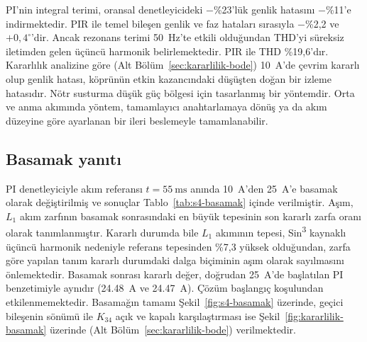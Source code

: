 PI'nin integral terimi, oransal denetleyicideki $-$\%23'lük genlik hatasını $-$\%11'e indirmektedir. PIR ile temel bileşen genlik ve faz hataları sırasıyla $-$\%2,2 ve $+0{,}4^{\circ}$'dir. Ancak rezonans terimi \SI{50}{\hertz}'te etkili olduğundan THD'yi süreksiz iletimden gelen üçüncü harmonik belirlemektedir. PIR ile THD \%19,6'dır. Kararlılık analizine göre (Alt Bölüm~\ref{sec:kararlilik-bode}) \SI{10}{\ampere}'de çevrim kararlı olup genlik hatası, köprünün etkin kazancındaki düşüşten doğan bir izleme hatasıdır. Nötr susturma düşük güç bölgesi için tasarlanmış bir yöntemdir. Orta ve anma akımında yöntem, tamamlayıcı anahtarlamaya dönüş ya da akım düzeyine göre ayarlanan bir ileri beslemeyle tamamlanabilir.

\subsection{Basamak yanıtı}

PI denetleyiciyle akım referansı $t=\SI{55}{\milli\second}$ anında \SI{10}{\ampere}'den \SI{25}{\ampere}'e basamak olarak değiştirilmiş ve sonuçlar Tablo~\ref{tab:s4-basamak} içinde verilmiştir. Aşım, $L_1$ akım zarfının basamak sonrasındaki en büyük tepesinin son kararlı zarfa oranı olarak tanımlanmıştır. Kararlı durumda bile $L_1$ akımının tepesi, Sin\textsuperscript{3} kaynaklı üçüncü harmonik nedeniyle referans tepesinden \%7,3 yüksek olduğundan, zarfa göre yapılan tanım kararlı durumdaki dalga biçiminin aşım olarak sayılmasını önlemektedir. Basamak sonrası kararlı değer, doğrudan \SI{25}{\ampere}'de başlatılan PI benzetimiyle aynıdır (\SI{24.48}{\ampere} ve \SI{24.47}{\ampere}). Çözüm başlangıç koşulundan etkilenmemektedir. Basamağın tamamı Şekil~\ref{fig:s4-basamak} üzerinde, geçici bileşenin sönümü ile $K_{34}$ açık ve kapalı karşılaştırması ise Şekil~\ref{fig:kararlilik-basamak} üzerinde (Alt Bölüm~\ref{sec:kararlilik-bode}) verilmektedir.

